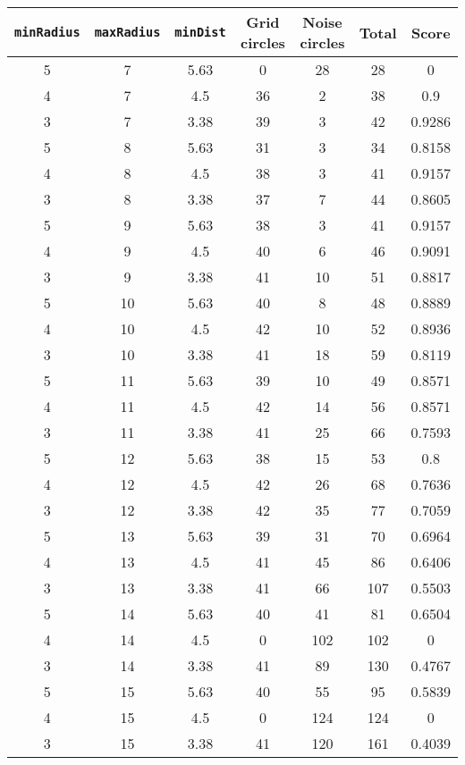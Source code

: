 \documentclass[letterpaper, 12pt]{article}
\begin{document}
\begin{longtable}{|c|c|c|c|c|c|c|}
\hline
\textbf{\texttt{minRadius}} & \textbf{\texttt{maxRadius}} & \textbf{\texttt{minDist}} & \textbf{Grid circles} & \textbf{Noise circles} & \textbf{Total} & \textbf{Score} \\
\hline
5 & 7 & 5.63 & 0 & 28 & 28 & 0 \\
\hline
4 & 7 & 4.5 & 36 & 2 & 38 & 0.9 \\
\hline
3 & 7 & 3.38 & 39 & 3 & 42 & 0.9286 \\
\hline
5 & 8 & 5.63 & 31 & 3 & 34 & 0.8158 \\
\hline
4 & 8 & 4.5 & 38 & 3 & 41 & 0.9157 \\
\hline
3 & 8 & 3.38 & 37 & 7 & 44 & 0.8605 \\
\hline
5 & 9 & 5.63 & 38 & 3 & 41 & 0.9157 \\
\hline
4 & 9 & 4.5 & 40 & 6 & 46 & 0.9091 \\
\hline
3 & 9 & 3.38 & 41 & 10 & 51 & 0.8817 \\
\hline
5 & 10 & 5.63 & 40 & 8 & 48 & 0.8889 \\
\hline
4 & 10 & 4.5 & 42 & 10 & 52 & 0.8936 \\
\hline
3 & 10 & 3.38 & 41 & 18 & 59 & 0.8119 \\
\hline
5 & 11 & 5.63 & 39 & 10 & 49 & 0.8571 \\
\hline
4 & 11 & 4.5 & 42 & 14 & 56 & 0.8571 \\
\hline
3 & 11 & 3.38 & 41 & 25 & 66 & 0.7593 \\
\hline
5 & 12 & 5.63 & 38 & 15 & 53 & 0.8 \\
\hline
4 & 12 & 4.5 & 42 & 26 & 68 & 0.7636 \\
\hline
3 & 12 & 3.38 & 42 & 35 & 77 & 0.7059 \\
\hline
5 & 13 & 5.63 & 39 & 31 & 70 & 0.6964 \\
\hline
4 & 13 & 4.5 & 41 & 45 & 86 & 0.6406 \\
\hline
3 & 13 & 3.38 & 41 & 66 & 107 & 0.5503 \\
\hline
5 & 14 & 5.63 & 40 & 41 & 81 & 0.6504 \\
\hline
4 & 14 & 4.5 & 0 & 102 & 102 & 0 \\
\hline
3 & 14 & 3.38 & 41 & 89 & 130 & 0.4767 \\
\hline
5 & 15 & 5.63 & 40 & 55 & 95 & 0.5839 \\
\hline
4 & 15 & 4.5 & 0 & 124 & 124 & 0 \\
\hline
3 & 15 & 3.38 & 41 & 120 & 161 & 0.4039 \\

\end{longtable}
\end{document}
